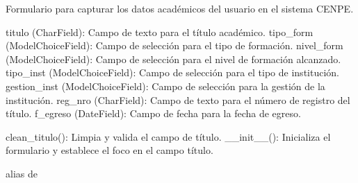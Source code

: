 \documentclass[letterpaper,10pt,spanish]{sphinxmanual}
\begin{document}
\begin{fulllineitems}

\pysigstartsignatures
{}
\pysigstopsignatures
\sphinxAtStartPar
Formulario para capturar los datos académicos del usuario en el sistema CENPE.
\begin{description}
\sphinxAtStartPar
titulo (CharField): Campo de texto para el título académico.
tipo\_form (ModelChoiceField): Campo de selección para el tipo de formación.
nivel\_form (ModelChoiceField): Campo de selección para el nivel de formación alcanzado.
tipo\_inst (ModelChoiceField): Campo de selección para el tipo de institución.
gestion\_inst (ModelChoiceField): Campo de selección para la gestión de la institución.
reg\_nro (CharField): Campo de texto para el número de registro del título.
f\_egreso (DateField): Campo de fecha para la fecha de egreso.

\sphinxAtStartPar
clean\_titulo(): Limpia y valida el campo de título.
\_\_init\_\_(): Inicializa el formulario y establece el foco en el campo título.

\end{description}


\begin{fulllineitems}

\pysigstartsignatures
{}
\pysigstopsignatures

\begin{fulllineitems}

\pysigstartsignatures
{}
\pysigstopsignatures
\end{fulllineitems}



\begin{fulllineitems}

\pysigstartsignatures
{}
\pysigstopsignatures
\sphinxAtStartPar
alias de 

\end{fulllineitems}




\end{fulllineitems}
\end{fulllineitems}
\end{document}
